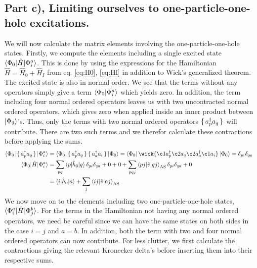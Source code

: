 \documentclass{article}
\newcommand{\gs}{\ket{\Phi_0}}
\newcommand{\inner}[3]{\braket{#1|#2|#3}}
\newcommand{\innerAS}[3]{\inner{#1}{#2}{#3}_{\text{AS}}}
\newcommand{\hnull}{\hat{h}_0}
\newcommand{\crt}[1]{a_{#1}^{\dagger}}
\newcommand{\ani}[1]{a_{#1}}
\begin{document}
\subsection*{Part c), Limiting ourselves to one-particle-one-hole excitations.}
    We will now calculate the matrix elements involving the one-particle-one-hole states. Firstly, we compute the elements including a single excited state $\inner{\Phi_0}{\hat{H}}{\Phi_i^a}$. This is done by using the expressions for the Hamiltonian $\hat{H} = \hat{H}_0 + \hat{H}_I$ from eq. \ref{eq:H0}, \ref{eq:HI} in addition to Wick's generalized theorem. The excited state is also in normal order. We see that the terms without any operators simply give a term $\braket{\Phi_0 | \Phi_{i}^{a}}$ which yields zero. In addition, the term including four normal ordered operators leaves us with two uncontracted normal ordered operators, which gives zero when applied inside an inner product between  $\gs$'s. Thus, only the terms with two normal ordered operators $\set{\crt{p}\ani{q}}$ will contribute. There are two such terms and we therefor calculate these contractions before applying the sums.  
    \begin{align}
        \inner{\Phi_0}{\set{\crt{p}\ani{q}}}{\Phi_{i}^{a}} &= \inner{\Phi_0}{\set{\crt{p}\ani{q}} \set{\crt{a}\ani{i}}}{\Phi_0} = \bra{\Phi_0} \wick{\c1{a}^\dagger_p \c2{a}_q \c2{a}^\dagger_a \c1{\ani{i}}} \ket{\Phi_0} = \delta_{pi}\delta_{qa} \nonumber\\
        \inner{\Phi_0}{\hat{H}}{\Phi_i^a} &= \sum_{pq} \inner{p}{\hnull}{q}\delta_{pi}\delta_{qa} + 0 + 0 + \sum_{pqj} \innerAS{pj}{\hat{v}}{qj}\delta_{pi}\delta_{qa} + 0 \nonumber\\
        &= \inner{i}{\hnull}{a} + \sum_j \innerAS{ij}{\hat{v}}{aj} \label{eq:phi0_phi_ia}
    \end{align}
    We now move on to the elements including two one-particle-one-hole states, $\inner{\Phi_i^a}{\hat{H}}{\Phi_j^b}$. For the terms in the Hamiltonian not having any normal ordered operators, we need be careful since we can have the same states on both sides in the case $i=j$ and $a=b$. In addition, both the term with two and four normal ordered operators can now contribute. For less clutter, we first calculate the contractions giving the relevant Kronecker delta's before inserting them into their respective sums. 
\end{document}

